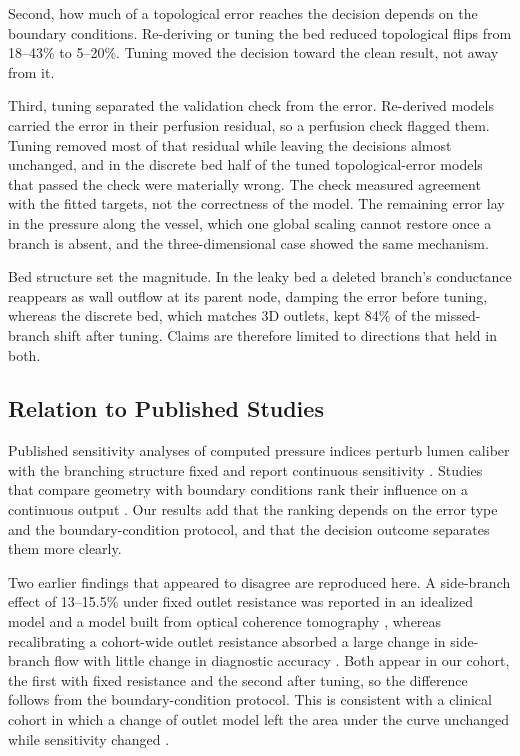 \documentclass[journal]{IEEEtran}
\begin{document}
Second, how much of a topological error reaches the decision depends on the boundary conditions. Re-deriving or
tuning the bed reduced topological flips from 18--43\% to 5--20\%. Tuning moved the decision toward the clean result, not away from it.

Third, tuning separated the validation check from the error. Re-derived models carried the error in their perfusion
residual, so a perfusion check flagged them. Tuning removed most of that residual while leaving the decisions almost
unchanged, and in the discrete bed half of the tuned topological-error models that passed the check were materially
wrong. The check measured agreement with the fitted targets, not the correctness of the model. The remaining error
lay in the pressure along the vessel, which one global scaling cannot restore once a branch is absent, and the
three-dimensional case showed the same mechanism.

Bed structure set the magnitude. In the leaky bed a deleted branch's conductance reappears as wall outflow at its
parent node, damping the error before tuning, whereas the discrete bed, which matches 3D outlets, kept 84\% of the
missed-branch shift after tuning. Claims are therefore limited to directions that held in both.

\subsection{Relation to Published Studies}
Published sensitivity analyses of computed pressure indices perturb lumen caliber with the branching structure fixed and report
continuous sensitivity \cite{sankaran2015tmi,sankaran2015cmame,fernandez2024,dalmaso2025}. Studies that compare geometry with boundary conditions rank their influence on a continuous output
\cite{sankaran2016,tanade2022,korte2023}. Our results add that the ranking depends on the error type and the
boundary-condition protocol, and that the decision outcome separates them more clearly.

Two earlier findings that appeared to disagree are reproduced here. A side-branch effect of 13--15.5\% under fixed outlet resistance was reported in an idealized model and a model built from optical coherence tomography \cite{gamage2022}, whereas recalibrating a cohort-wide outlet resistance absorbed a large change in side-branch flow with little change in diagnostic accuracy \cite{gosling2020}. Both appear in our cohort, the first with fixed resistance and the second after tuning, so the difference follows
from the boundary-condition protocol. This is consistent with a clinical cohort in which a change of outlet model left
the area under the curve unchanged while sensitivity changed \cite{fossan2026}.
\end{document}
